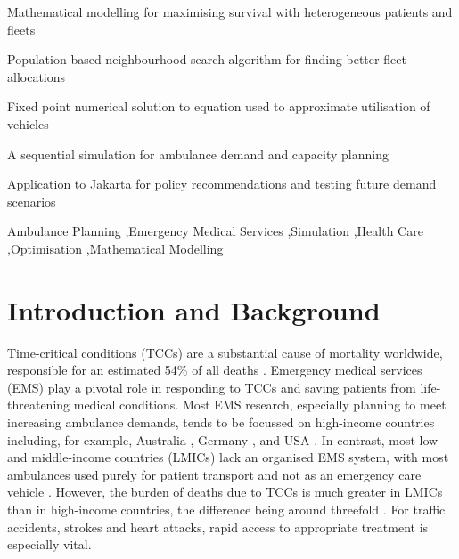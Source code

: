 \documentclass[preprint,12pt]{elsarticle}
\begin{document}
\begin{frontmatter}
\begin{abstract}
\end{abstract}


\begin{highlights}
\item Mathematical modelling for maximising survival with heterogeneous
      patients and fleets
\item Population based neighbourhood search algorithm for finding better fleet
      allocations
\item Fixed point numerical solution to equation used to approximate utilisation
      of vehicles
\item A sequential simulation for ambulance demand and capacity planning
\item Application to Jakarta for policy recommendations and testing future
      demand scenarios
\end{highlights}

\begin{keyword}
Ambulance Planning \sep Emergency Medical Services \sep Simulation \sep Health Care \sep Optimisation \sep Mathematical Modelling
\end{keyword}

\end{frontmatter}


\newpage


\section{Introduction and Background}\label{sec:intro}
Time-critical conditions (TCCs) are a substantial cause of mortality
worldwide, responsible for an estimated 54\% of all deaths \cite{FraserBMJ}.
Emergency medical services (EMS) play a pivotal role in responding to TCCs and
saving patients from life-threatening medical conditions. Most EMS research,
especially  planning to meet increasing ambulance demands, tends to be
focussed on high-income countries including, for example, Australia
\cite{lowthian2011increasing}, Germany \cite{veser2015demographic}, and USA
\cite{birmingham2021trends}. In contrast, most low and middle-income countries
(LMICs) lack an organised EMS system, with most ambulances used purely for
patient transport and not as an emergency care vehicle \cite{plummer2017ems}.
However, the burden of deaths due to TCCs is much greater in LMICs than in
high-income countries, the difference being around threefold \cite{ChangPMC}.
For traffic accidents, strokes and heart attacks, rapid access to appropriate
treatment is especially vital. 
\end{document}
